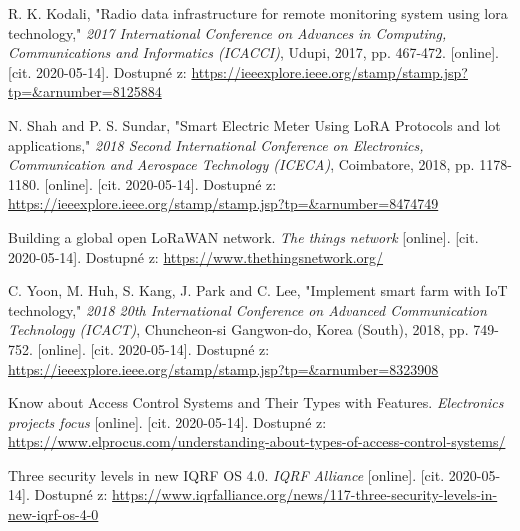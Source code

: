 \begin{thebibliography}{9}
R. K. Kodali, "Radio data infrastructure for remote monitoring system using lora technology," \textit{2017 International Conference on Advances in Computing, Communications and Informatics (ICACCI)}, Udupi, 2017, pp. 467-472.
[online]. [cit. 2020-05-14]. Dostupné z: 
\url{
https://ieeexplore.ieee.org/stamp/stamp.jsp?tp=&arnumber=8125884
}
 


N. Shah and P. S. Sundar, "Smart Electric Meter Using LoRA Protocols and lot applications," \textit{2018 Second International Conference on Electronics, Communication and Aerospace Technology (ICECA)}, Coimbatore, 2018, pp. 1178-1180.
[online]. [cit. 2020-05-14]. Dostupné z: 
\url{
https://ieeexplore.ieee.org/stamp/stamp.jsp?tp=&arnumber=8474749
}
 


Building a global open LoRaWAN network. \textit{ The things network } [online]. [cit. 2020-05-14]. Dostupné z: 
\url{
https://www.thethingsnetwork.org/
}



C. Yoon, M. Huh, S. Kang, J. Park and C. Lee, "Implement smart farm with IoT technology," \textit{2018 20th International Conference on Advanced Communication Technology (ICACT)}, Chuncheon-si Gangwon-do, Korea (South), 2018, pp. 749-752.
[online]. [cit. 2020-05-14]. Dostupné z: 
\url{
https://ieeexplore.ieee.org/stamp/stamp.jsp?tp=&arnumber=8323908
}
 



Know about Access Control Systems and Their Types with Features. \textit{Electronics projects focus}
[online]. [cit. 2020-05-14]. Dostupné z: 
\url{
https://www.elprocus.com/understanding-about-types-of-access-control-systems/
}
 




Three security levels in new IQRF OS 4.0. \textit{IQRF Alliance } [online]. [cit. 2020-05-14]. Dostupné z: 
\url{
https://www.iqrfalliance.org/news/117-three-security-levels-in-new-iqrf-os-4-0
}



\end{thebibliography}
